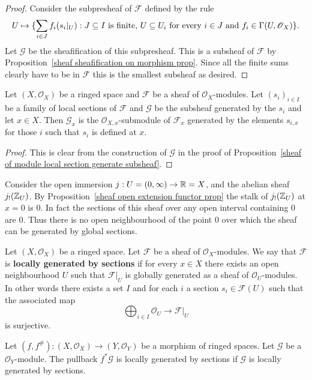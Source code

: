 \begin{proof}
Consider the subpresheaf of $\mathscr{F}$ defined by the rule
\[U\mapsto\{\sum_{i\in J}f_i(s_i|_U):\text{$J\subseteq I$ is finite, $U\subseteq U_i$ for every $i\in J$ and $f_i\in\Gamma(U,\mathscr{O}_X)$}\}.\]
Let $\mathscr{G}$ be the sheafification of this subpresheaf. This is a subsheaf of $\mathscr{F}$ by Proposition~\ref{sheaf sheafification on morphism prop}. Since all the finite sums clearly have to be in $\mathscr{F}$ this is the smallest subsheaf as desired.
\end{proof}
\begin{proposition}
Let $(X,\mathscr{O}_X)$ be a ringed space and $\mathscr{F}$ be a sheaf of $\mathscr{O}_X$-modules. Let $(s_i)_{i\in I}$ be a family of local sections of $\mathscr{F}$ and $\mathscr{G}$ be the subsheaf generated by the $s_i$ and let $x\in X$. Then $\mathscr{G}_x$ is the $\mathscr{O}_{X,x}$-submodule of $\mathscr{F}_x$ generated by the elements $s_{i,x}$ for those $i$ such that $s_i$ is defined at $x$.
\end{proposition}
\begin{proof}
This is clear from the construction of $\mathscr{G}$ in the proof of Proposition~\ref{sheaf of module local section generate subsheaf}.
\end{proof}
\begin{example}\label{sheaf of module not generated by global section eg}
Consider the open immersion $j:U=(0,\infty)\to\mathbb{R}=X$, and the abelian sheaf $j_!(\mathbb{Z}_U)$. By Proposition~\ref{sheaf open extension functor prop} the stalk of $j_!(\mathbb{Z}_U)$ at $x=0$ is $0$. In fact the sections of this sheaf over any open interval containing $0$ are $0$. Thus there is no open neighbourhood of the point $0$ over which the sheaf can be generated by global sections.
\end{example}
Let $(X,\mathscr{O}_X)$ be a ringed space. Let $\mathscr{F}$ be a sheaf of $\mathscr{O}_X$-modules. We say that $\mathscr{F}$ is \textbf{locally generated by sections} if for every $x\in X$ there exists an open neighbourhood $U$ such that $\mathscr{F}|_U$ is globally generated as a sheaf of $\mathscr{O}_U$-modules. In other words there exists a set $I$ and for each $i$ a section $s_i\in\mathscr{F}(U)$ such that the associated map
\[\bigoplus_{i\in I}\mathscr{O}_U\to\mathscr{F}|_U\]
is surjective.
\begin{proposition}\label{pull back local generated section}
Let $(f,f^{\#}):(X,\mathscr{O}_X)\to(Y,\mathscr{O}_Y)$ be a morphism of ringed spaces. Let $\mathscr{G}$ be a $\mathscr{O}_Y$-module. The pullback $f^*\mathscr{G}$ is locally generated by sections if $\mathscr{G}$ is locally generated by sections.
\end{proposition}
